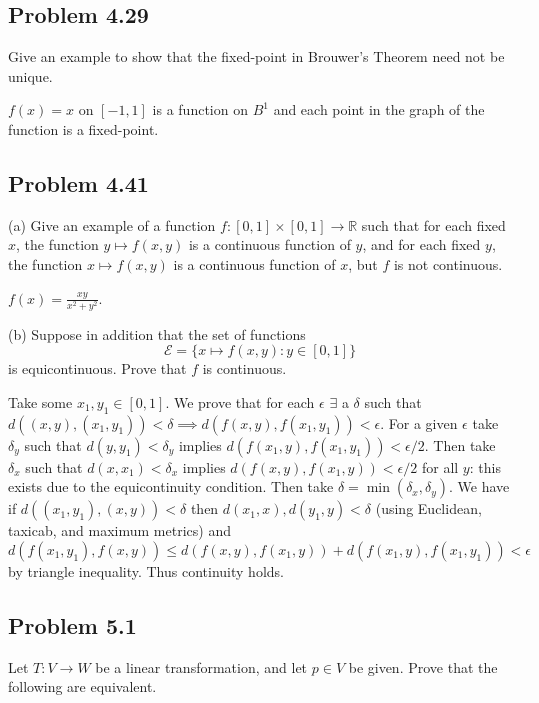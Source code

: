 \documentclass{amsart}
\begin{document}
\newpage

\subsection*{Problem 4.29} Give an example to show that the fixed-point in Brouwer's Theorem need not be unique.

\medskip \noindent $f(x)=x$ on $[-1, 1]$ is a function on $B^1$ and each point in the graph of the function
is a fixed-point.

\newpage

\subsection*{Problem 4.41} (a) Give an example of a function 
\( f : [0,1] \times [0,1] \rightarrow \mathbb{R} \) such that for each fixed 
\( x \), the function \( y \mapsto f(x,y) \) is a continuous function of \( y \), 
and for each fixed \( y \), the function \( x \mapsto f(x,y) \) is a continuous function 
of \( x \), but \( f \) is not continuous.

\medskip \noindent $f(x)= \frac{xy}{x^2+y^2}$. 

\bigskip

(b) Suppose in addition that the set of functions
\[
\mathcal{E} = \{ x \mapsto f(x,y) : y \in [0,1] \}
\]
is equicontinuous. Prove that \( f \) is continuous.

\medskip \noindent Take some $x_1, y_1\in[0,1]$. We prove that for each $\epsilon$ $\exists$
a $\delta$ such that $d((x,y), (x_1, y_1))<\delta\implies d(f(x,y), f(x_1, y_1))<\epsilon$. 
For a given $\epsilon$ take $\delta_y$ such that $d(y, y_1)<\delta_y$ implies $d(f(x_1, y), f(x_1, y_1))<\epsilon/2$.
Then take $\delta_x$ such that $d(x, x_1)<\delta_x$ implies $d(f(x, y), f(x_1, y))<\epsilon/2$ for all $y$: this exists
due to the equicontinuity condition. Then take $\delta = \min(\delta_x, \delta_y)$. We have if
$d((x_1, y_1), (x, y))<\delta$ then $d(x_1, x), d(y_1, y)<\delta$ (using Euclidean, taxicab, and maximum metrics) and 
$d(f(x_1, y_1), f(x, y))\leq d(f(x, y), f(x_1, y))+d(f(x_1, y), f(x_1, y_1))<\epsilon$ by triangle
inequality. Thus continuity holds.

\newpage

\subsection*{Problem 5.1} Let \( T : V \rightarrow W \) be a linear transformation, 
and let \( p \in V \) be given. Prove that the following are equivalent.
\end{document}
